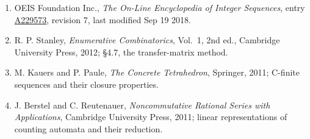 \documentclass[11pt]{article}
\theoremstyle{definition}
\begin{document}
\begin{enumerate}

\item OEIS Foundation Inc., \emph{The On-Line Encyclopedia of Integer Sequences}, entry \href{https://oeis.org/A229573}{A229573}, revision 7, last modified Sep 19 2018.

\item R. P. Stanley, \emph{Enumerative Combinatorics}, Vol.~1, 2nd ed., Cambridge University Press, 2012; \S4.7, the transfer-matrix method.

\item M. Kauers and P. Paule, \emph{The Concrete Tetrahedron}, Springer, 2011; C-finite sequences and their closure properties.

\item J. Berstel and C. Reutenauer, \emph{Noncommutative Rational Series with Applications}, Cambridge University Press, 2011; linear representations of counting automata and their reduction.

\end{enumerate}
\end{document}
